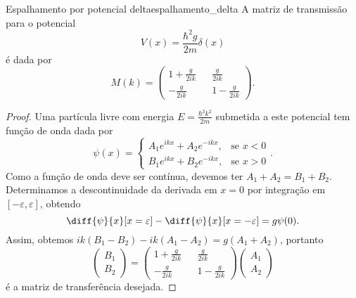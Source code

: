 \begin{lemma}{Espalhamento por potencial delta}{espalhamento_delta}
    A matriz de transmissão para o potencial
    \begin{equation*}
        V(x) = \frac{\hbar^2 g}{2m} \delta(x)
    \end{equation*}
    é dada por
    \begin{equation*}
        M(k) =
        \begin{pmatrix}
            1 + \frac{g}{2ik} && \frac{g}{2ik}\\
            -\frac{g}{2ik} && 1 - \frac{g}{2ik}
        \end{pmatrix}.
    \end{equation*}
\end{lemma}
\begin{proof}
    Uma partícula livre com energia \(E = \frac{\hbar^2k^2}{2m}\) submetida a este potencial tem função de onda dada por
    \begin{equation*}
        \psi(x) = \begin{cases}
            A_1 e^{ikx} + A_2 e^{-ikx},&\text{se }x < 0\\
            B_1 e^{ikx} + B_2 e^{-ikx},&\text{se }x > 0
        \end{cases}.
    \end{equation*}
    Como a função de onda deve ser contínua, devemos ter \(A_1 + A_2 = B_1 + B_2\). Determinamos a descontinuidade da derivada em \(x = 0\) por integração em \([-\varepsilon, \varepsilon]\), obtendo
    \begin{equation*}
        \diff{\psi}{x}[x = \varepsilon] - \diff{\psi}{x}[x = -\varepsilon] = g \psi(0).
    \end{equation*}
    Assim, obtemos \(ik(B_1 - B_2) - ik(A_1 - A_2) = g (A_1 + A_2)\), portanto
    \begin{equation*}
        \begin{pmatrix}
            B_1\\
            B_2
        \end{pmatrix} =
        \begin{pmatrix}
            1 + \frac{g}{2ik} && \frac{g}{2ik}\\
            -\frac{g}{2ik} && 1 - \frac{g}{2ik}
        \end{pmatrix}
        \begin{pmatrix}
            A_1\\
            A_2
        \end{pmatrix}
    \end{equation*}
    é a matriz de transferência desejada.
\end{proof}
